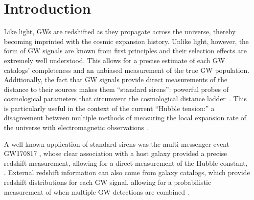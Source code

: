 \documentclass[]{aastex631}
\begin{document}
\section{Introduction}
\label{sec:intro}
Like light, \acp{GW} are redshifted as they propagate across the universe, thereby becoming imprinted with the cosmic expansion history.
Unlike light, however, the form of \ac{GW} signals are known from first principles and their selection effects are extremely well understood.
This allows for a precise estimate of each \ac{GW} catalogs' completeness and an unbiased measurement of the true \ac{GW} population. 
Additionally, the fact that \ac{GW} signals provide direct measurements of the distance to their sources makes them ``standard sirens'': powerful probes of cosmological parameters that circumvent the cosmological distance ladder~\citep{schutz_determining_1986,holz_using_2005}. 
This is particularly useful in the context of the current ``Hubble tension:'' a disagreement between multiple methods of measuring the local expansion rate of the universe with electromagnetic observations \citep{freedman_measurements_2021}.

A well-known application of standard sirens was the multi-messenger event GW170817 \citep{abbott_multi-messenger_2017}, whose clear association with a host galaxy provided a precise redshift measurement, allowing for a direct measurement of the Hubble constant, \Ho{} \citep{ abbott_gravitational-wave_2017}.
External redshift information can also come from galaxy catalogs, which provide redshift distributions for each \ac{GW} signal, allowing for a probabilistic measurement of \Ho{} when multiple \ac{GW} detections are combined \citep[e.g.][]{del_pozzo_inference_2012, chen_two_2018, fishbach_standard_2019, gray_cosmological_2020, gwtc3_cosmo, gair_hitchhikers_2023}.
\end{document}
